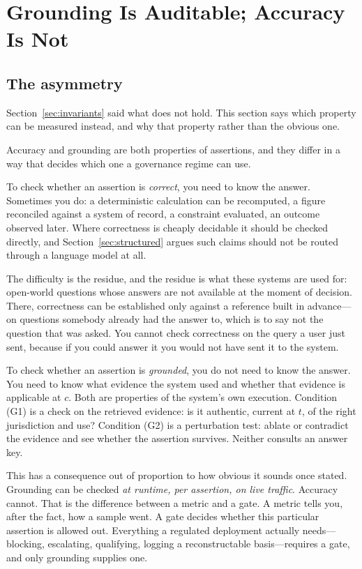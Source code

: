 \section{Grounding Is Auditable; Accuracy Is Not}
\label{sec:auditable}

\subsection{The asymmetry}

Section~\ref{sec:invariants} said what does not hold. This section says which property
can be measured instead, and why that property rather than the obvious one.

Accuracy and grounding are both properties of assertions, and they differ in a way
that decides which one a governance regime can use.

To check whether an assertion is \emph{correct}, you need to know the answer.
Sometimes you do: a deterministic
calculation can be recomputed, a figure reconciled against a system of record, a
constraint evaluated, an outcome observed later. Where correctness is cheaply decidable
it should be checked directly, and Section~\ref{sec:structured} argues such claims
should not be routed through a language model at all.

The difficulty is the residue, and the residue is what these systems are used for:
open-world questions whose answers are not available at the moment of decision. There,
correctness can be established only against a reference built in advance---on questions
somebody already had the answer to, which is to say not the question that was asked. You cannot check correctness on the query a user just sent, because
if you could answer it you would not have sent it to the system.

To check whether an assertion is \emph{grounded}, you do not need to know the
answer. You need to know what evidence the system used and whether that evidence
is applicable at $c$. Both are properties of the system's own execution. Condition
(G1) is a check on the retrieved evidence: is it authentic, current at $t$, of
the right jurisdiction and use? Condition (G2) is a perturbation test: ablate or
contradict the evidence and see whether the assertion survives. Neither consults
an answer key.

This has a consequence out of proportion to how obvious it sounds once stated.
Grounding can be checked \emph{at runtime, per assertion, on live traffic}.
Accuracy cannot. That is the difference between a metric and a gate. A metric
tells you, after the fact, how a sample went. A gate decides whether this
particular assertion is allowed out. Everything a regulated deployment actually
needs---blocking, escalating, qualifying, logging a reconstructable basis---requires
a gate, and only grounding supplies one.

